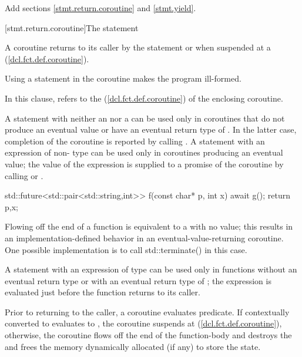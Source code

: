 Add sections \ref{stmt.return.coroutine} and \ref{stmt.yield}.

[stmt.return.coroutine]{The  statement}%

\pnum
A coroutine returns to its caller by the  statement
or when suspended at a  (\ref{dcl.fct.def.coroutine}).

\pnum
Using a  statement in the coroutine makes the program ill-formed.

\pnum
  In this clause,  refers to the   
  (\ref{dcl.fct.def.coroutine})
  of the enclosing coroutine.
  
\pnum
A  statement
with neither an  nor a 
can be used only in coroutines
that do not produce an eventual value or have an eventual return type of . In the latter case, completion of the coroutine
is reported by calling .
A  statement with an expression of non- type can be used only
in coroutines producing an eventual value; the value of the expression is supplied to a promise of the coroutine by calling 
 or
.

\enterexample

\begin{codeblock}
  std::future<std::pair<std::string,int>> f(const char* p, int x) {
    await g();
    return {p,x};
  }
\end{codeblock}
\exitexample

Flowing off the end of a function is equivalent to a  with
no value; 
this results in an implementation-defined behavior in an eventual-value-returning coroutine.
\enternote
One possible implementation is to call std::terminate() in this case.
\exitnote

\pnum
A  statement with an expression of type 
can be used only in functions without an eventual return type 
or with an eventual return type of ; the expression is evaluated just before the function
returns to its caller.

\pnum
Prior to returning to the caller, a coroutine evaluates
 predicate. If  contextually converted to  evaluates to
, the coroutine suspends at  (\ref{dcl.fct.def.coroutine}),
otherwise, the coroutine flows off the end of the function-body and destroys the  and frees the memory dynamically allocated (if any) to store the state.

